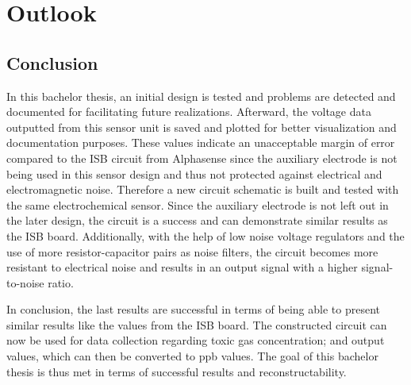 \chapter{Outlook}
\label{sec:outlook}
\section{Conclusion}

In this bachelor thesis, an initial design is tested and problems are detected and documented for facilitating future realizations. Afterward, the voltage data outputted from this sensor unit is saved and plotted for better visualization and documentation purposes. These values indicate an unacceptable margin of error compared to the ISB circuit from Alphasense since the auxiliary electrode is not being used in this sensor design and thus not protected against electrical and electromagnetic noise. Therefore a new circuit schematic is built and tested with the same electrochemical sensor. Since the auxiliary electrode is not left out in the later design, the circuit is a success and can demonstrate similar results as the ISB board. Additionally, with the help of low noise voltage regulators and the use of more resistor-capacitor pairs as noise filters, the circuit becomes more resistant to electrical noise and results in an output signal with a higher signal-to-noise ratio.\par 
In conclusion, the last results are successful in terms of being able to present similar results like the values from the ISB board. The constructed circuit can now be used for data collection regarding toxic gas concentration; and output values, which can then be converted to ppb values. The goal of this bachelor thesis is thus met in terms of successful results and reconstructability. 

